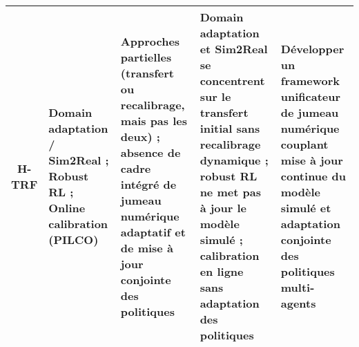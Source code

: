 \begin{table}[h!]
{\begin{tabularx}{\textwidth}{cXXXX}
      \textbf{H-TRF}
       & Domain adaptation / Sim2Real ; Robust RL ; Online calibration (PILCO)
       & Approches partielles (transfert ou recalibrage, mais pas les deux) ; absence de cadre intégré de jumeau numérique adaptatif et de mise à jour conjointe des politiques
       & Domain adaptation et Sim2Real se concentrent sur le transfert initial sans recalibrage dynamique ; robust RL ne met pas à jour le modèle simulé ; calibration en ligne sans adaptation des politiques
       & Développer un framework unificateur de jumeau numérique couplant mise à jour continue du modèle simulé et adaptation conjointe des politiques multi-agents                                            \\
      \hline
    \end{tabularx}
  }
\end{table}

